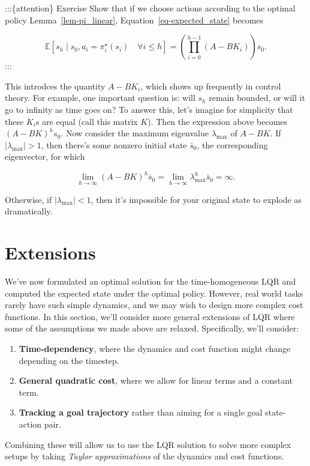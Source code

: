 \documentclass[
  letterpaper,
  DIV=11,
  numbers=noendperiod]{scrreprt}
\theoremstyle{plain}
\theoremstyle{plain}
\theoremstyle{definition}
\theoremstyle{definition}
\theoremstyle{remark}
\begin{document}
:::\{attention\} Exercise Show that if we choose actions according to
the optimal policy Lemma~\ref{lem-pi_linear},
Equation~\ref{eq-expected_state} becomes

\[
\mathbb{E}[s_h\mid s_0, a_i = \pi^\star_i(s_i)\quad \forall i \le h] = \left( \prod_{i=0}^{h-1} (A - B K_i) \right) s_0.
\] :::

This introdces the quantity \(A - B K_i\), which shows up frequently in
control theory. For example, one important question is: will \(s_h\)
remain bounded, or will it go to infinity as time goes on? To answer
this, let's imagine for simplicity that these \(K_i\)s are equal (call
this matrix \(K\)). Then the expression above becomes \((A-BK)^hs_0\).
Now consider the maximum eigenvalue \(\lambda_{\max}\) of \(A - BK\). If
\(|\lambda_{\max}| > 1\), then there's some nonzero initial state
\(\bar s_0\), the corresponding eigenvector, for which

\[
\lim_{h\to \infty} (A - BK)^h\bar s_0
    = \lim_{h\to \infty} \lambda_{\max}^h\bar s_0
    = \infty.
\]

Otherwise, if \(|\lambda_{\max}| < 1\), then it's impossible for your
original state to explode as dramatically.

\section{Extensions}\label{extensions}

We've now formulated an optimal solution for the time-homogeneous LQR
and computed the expected state under the optimal policy. However, real
world tasks rarely have such simple dynamics, and we may wish to design
more complex cost functions. In this section, we'll consider more
general extensions of LQR where some of the assumptions we made above
are relaxed. Specifically, we'll consider:

\begin{enumerate}
\def\labelenumi{\arabic{enumi}.}
\item
  \textbf{Time-dependency}, where the dynamics and cost function might
  change depending on the timestep.
\item
  \textbf{General quadratic cost}, where we allow for linear terms and a
  constant term.
\item
  \textbf{Tracking a goal trajectory} rather than aiming for a single
  goal state-action pair.
\end{enumerate}

Combining these will allow us to use the LQR solution to solve more
complex setups by taking \emph{Taylor approximations} of the dynamics
and cost functions.
\end{document}
